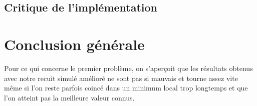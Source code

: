 \documentclass{report}
\begin{document}
\section{Critique de l'implémentation}

\chapter{Conclusion générale}
Pour ce qui concerne le premier problème, on s'aperçoit que les résultats obtenus avec notre recuit simulé amélioré ne sont pas si mauvais et tourne assez vite même si l'on reste parfois coincé dans un minimum local trop longtemps et que l'on atteint pas la meilleure valeur connus.
\end{document}
